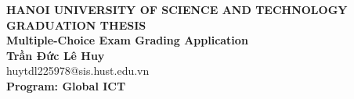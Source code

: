\documentclass[Main.tex]{subfiles}
\begin{document}
\begin{titlepage}
\thispagestyle{empty}
\begin{center}

{\textbf{\large{HANOI UNIVERSITY OF SCIENCE AND TECHNOLOGY}}}\\[4cm]

{\textbf{\huge{GRADUATION THESIS}}}\\[1cm]
{\textbf{\Large{Multiple-Choice Exam Grading Application}}}\\[1cm]

{\textbf{\large{Trần Đức Lê Huy}}}\\
{\large{huytdl225978@sis.hust.edu.vn}}\\[0.5cm]

{\textbf{\large{Program: Global ICT
}}}\\

\vspace{4cm}
\begin{table}[H]
\centering
{}
\end{table}
\end{center}



\end{titlepage}
\end{document}
